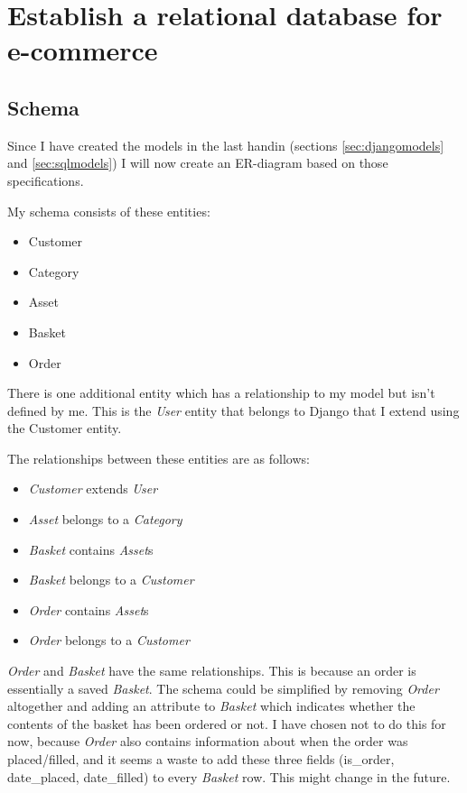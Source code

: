 \documentclass[12pt, a4paper,titlepage]{article}
\begin{document}
\section{Establish a relational database for e-commerce}
\subsection{Schema}
Since I have created the models in the last handin 
(sections \ref{sec:djangomodels} and \ref{sec:sqlmodels})
I will now create an ER-diagram based on those specifications.

My schema consists of these entities:
\begin{itemize}
\setlength\itemsep{-5pt}
\item Customer
\item Category
\item Asset
\item Basket
\item Order
\end{itemize}
There is one additional entity which has a relationship to my model but isn't
defined by me. This is the \emph{User} entity that belongs to Django that I
extend using the Customer entity.

The relationships between these entities are as follows:
\begin{itemize}
\setlength\itemsep{-5pt}
\item \emph{Customer} extends \emph{User}
\item \emph{Asset} belongs to a \emph{Category}
\item \emph{Basket} contains \emph{Asset}s
\item \emph{Basket} belongs to a \emph{Customer}
\item \emph{Order} contains \emph{Asset}s
\item \emph{Order} belongs to a \emph{Customer}
\end{itemize}
\emph{Order} and \emph{Basket} have the same relationships. This is because
an order is essentially a saved \emph{Basket}. The schema could be simplified
by removing \emph{Order} altogether and adding an attribute to \emph{Basket}
which indicates whether the contents of the basket has been ordered or not.
I have chosen not to do this for now, because \emph{Order} also contains
information about when the order was placed/filled, and it seems a waste to
add these three fields (is\_order, date\_placed, date\_filled) to every
\emph{Basket} row. This might change in the future.
\end{document}

